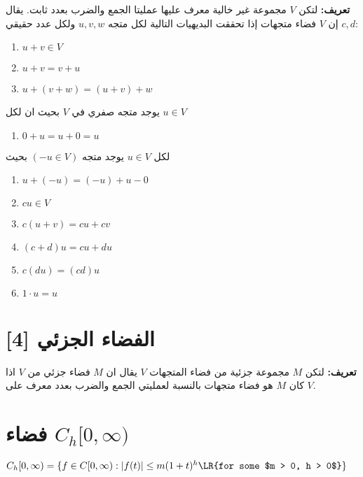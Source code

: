 	\textbf{تعريف:}  
	لتكن \( V \) مجموعة غير خالية معرف عليها عمليتا الجمع والضرب بعدد ثابت. يقال إن \( V \) فضاء متجهات إذا تحققت البديهيات التالية لكل متجه \( u, v, w \) ولكل عدد حقيقي \( c, d \):
\begin{english}
		\begin{enumerate}[label=\arabic*)]
		\item \( u + v \in V \)
		\item \( u + v = v + u \)
		\item \( u + (v + w) = (u + v) + w \)
	\end{enumerate}
	\end{english}
	يوجد متجه صفري في $V$ بحيث ان لكل $u\in V$
	\begin{english}
		\begin{enumerate}[label=\arabic*), start=4]
			\item \(0 + u = u + 0 = u\)
		\end{enumerate}
	\end{english}
	لكل $u \in V$ يوجد متجه $(-u \in V)$ بحيث
	\begin{english}
		\begin{enumerate}[label=\arabic*), start=5]
\item $u + (-u) = (-u) + u - 0$
		\item \( c u \in V \)
		\item \( c (u + v) = cu + cv \)
		\item \( (c + d) u = cu + du \)
		\item \( c (d u) = (cd) u \)
		\item \( 1 \cdot u = u \)
	\end{enumerate}
\end{english}
	
	\section{الفضاء الجزئي  [4]}
		\textbf{تعريف:} لتكن $M$ مجموعة جزئية من فضاء المتجهات $V$ يقال ان $M$ فضاء جزئي من $V$ اذا كان $M$  هو فضاء متجهات بالنسبة لعمليتي الجمع والضرب بعدد معرف على $V$.
	\section{فضاء $C_h[0, \infty)$}
	\begin{center}
		$C_h[0, \infty) = \{f\in C[0, \infty) : |f(t)| \leq m(1+t)^h \text{\LR{for some $m > 0, h > 0$}}\}$
	\end{center}
	
